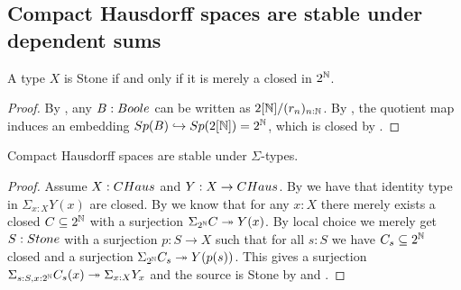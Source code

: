 \subsection{Compact Hausdorff spaces are stable under dependent sums}

\begin{lemma}\label{StoneAsClosedSubsetOfCantor}
A type $X$ is Stone if and only if it is merely a closed in $2^{\mathbb{N}}$.
\end{lemma}
\begin{proof}
  By , any $B:\Boole$ can be written as $2[\mathbb{N}]/(r_n)_{n:\mathbb{N}}$. %
  By , the quotient map induces an embedding $Sp(B)\hookrightarrow Sp(2[\mathbb{N}])= 2^{\mathbb{N}}$, 
  which is closed by .
\end{proof}


\begin{lemma}\label{SigmaCompactHausdorff}
Compact Hausdorff spaces are stable under $\Sigma$-types.
\end{lemma}

\begin{proof}
Assume $X:\CHaus$ and $Y:X\to \CHaus$. By  we have that identity type in $\Sigma_{x:X}Y(x)$ are closed. By  we know that for any $x:X$ there merely exists a closed $C\subseteq 2^{\mathbb{N}}$ with a surjection $\Sigma_{2^{\mathbb{N}}}C \twoheadrightarrow Y(x)$. By local choice we merely get $S:\Stone$ with a surjection $p:S\to X$ such that for all $s:S$ we have $C_s\subseteq 2^{\mathbb{N}}$ closed and a surjection $\Sigma_{2^{\mathbb{N}}}C_s\twoheadrightarrow Y(p(s))$. This gives a surjection $\Sigma_{s:S,x:2^{\mathbb{N}}}C_s(x)\twoheadrightarrow\Sigma_{x:X}Y_x$ and the source is Stone by  and .
\end{proof}
